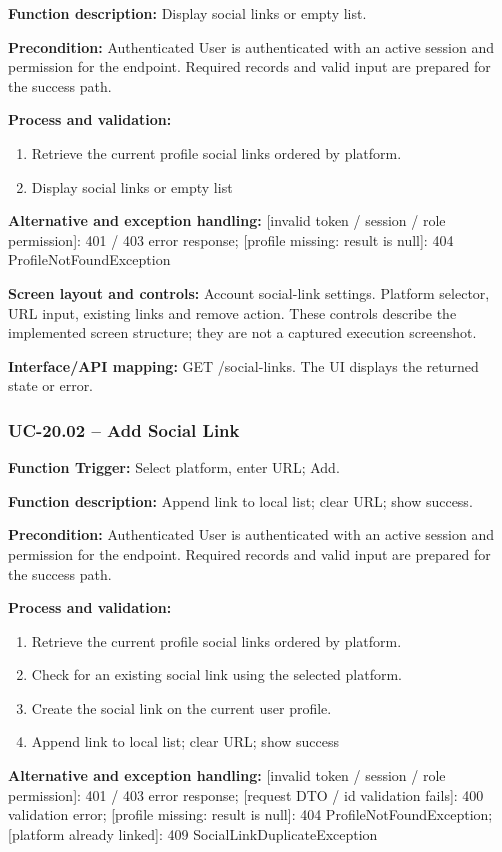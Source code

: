 \textbf{Function description:} Display social links or empty list.

\textbf{Precondition:} Authenticated User is authenticated with an active session and permission for the endpoint. Required records and valid input are prepared for the success path.

\textbf{Process and validation:}
\begin{enumerate}
\item Retrieve the current profile social links ordered by platform.
\item Display social links or empty list
\end{enumerate}
\textbf{Alternative and exception handling:} [invalid token /\allowbreak{} session /\allowbreak{} role permission]: 401 /\allowbreak{} 403 error response; [profile missing: result is null]: 404 Profile\allowbreak{}Not\allowbreak{}Found\allowbreak{}Exception

\textbf{Screen layout and controls:} Account social-link settings. Platform selector, URL input, existing links and remove action. These controls describe the implemented screen structure; they are not a captured execution screenshot.

\textbf{Interface/\allowbreak{}API mapping:} GET /\allowbreak{}social-links. The UI displays the returned state or error.

\subsubsection{UC-20.02 -- Add Social Link}
\textbf{Function Trigger:} Select platform, enter URL; Add.

\textbf{Function description:} Append link to local list; clear URL; show success.

\textbf{Precondition:} Authenticated User is authenticated with an active session and permission for the endpoint. Required records and valid input are prepared for the success path.

\textbf{Process and validation:}
\begin{enumerate}
\item Retrieve the current profile social links ordered by platform.
\item Check for an existing social link using the selected platform.
\item Create the social link on the current user profile.
\item Append link to local list; clear URL; show success
\end{enumerate}
\textbf{Alternative and exception handling:} [invalid token /\allowbreak{} session /\allowbreak{} role permission]: 401 /\allowbreak{} 403 error response; [request DTO /\allowbreak{} id validation fails]: 400 validation error; [profile missing: result is null]: 404 Profile\allowbreak{}Not\allowbreak{}Found\allowbreak{}Exception; [platform already linked]: 409 Social\allowbreak{}Link\allowbreak{}Duplicate\allowbreak{}Exception

